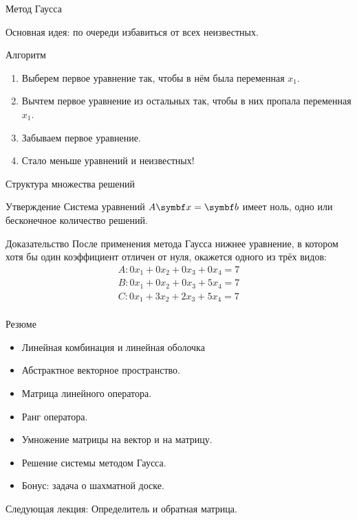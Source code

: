 \begin{frame}{Метод Гаусса}

Основная идея: по очереди избавиться от всех неизвестных.
\pause

\begin{block}{Алгоритм}
\begin{enumerate}
    \item Выберем первое уравнение так, чтобы в нём была переменная $x_1$.
    \pause
    \item Вычтем первое уравнение из остальных так, чтобы в них пропала переменная $x_1$.
    \pause
    \item Забываем первое уравнение.
    \pause
    \item Стало меньше уравнений и неизвестных!
\end{enumerate}

\end{block}


\end{frame}



\begin{frame}{Структура множества решений}
\begin{block}{Утверждение}
Система уравнений $A \bx = \bb$ имеет ноль, одно или бесконечное количество решений. 
\end{block}

\begin{block}{Доказательство}
После применения метода Гаусса нижнее уравнение, в котором хотя бы один коэффициент 
отличен от нуля, окажется одного из трёх видов:
\[
\begin{array}{l}
A: 0x_1 + 0x_2 + 0x_3 + 0x_4 = 7 \\    
B: 0x_1 + 0x_2 + 0x_3 + 5x_4 = 7 \\
C: 0x_1 + 3x_2 + 2x_3 + 5x_4 = 7 \\
\end{array}
\]
\end{block}


\end{frame}




\begin{frame}{Резюме}


\begin{itemize}[<+->]
\item Линейная комбинация и линейная оболочка
\item Абстрактное векторное пространство.
\item Матрица линейного оператора.
\item Ранг оператора. 
\item Умножение матрицы на вектор и на матрицу.
\item Решение системы методом Гаусса.
\item Бонус: задача о шахматной доске.
\end{itemize}
\pause
\alert{Следующая лекция:} Определитель и обратная матрица.



\end{frame}
    